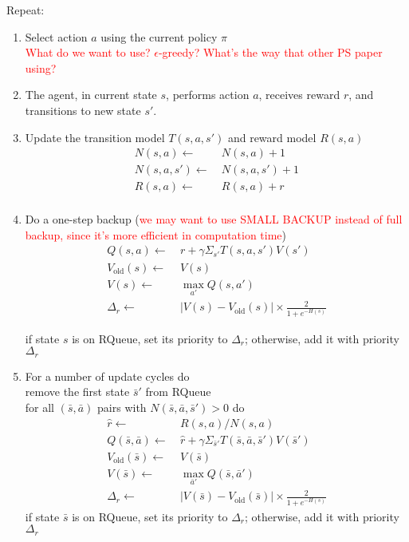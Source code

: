 \documentclass{article}
\begin{document}
Repeat:\\

\begin{enumerate}

\item Select action \(a\) using the current policy $\pi$\\
\textcolor{red}{What do we want to use? $\epsilon$-greedy? What's the way that other PS paper using?}

\item The agent, in current state \(s\), performs action \(a\), receives reward \(r\), and transitions to new state \(s'\).

\item Update the transition model \(T(s,a,s')\) and reward model \(R(s,a)\)
\[
\begin{split}
N(s,a) \leftarrow &\ N(s,a) + 1\\
N(s,a,s') \leftarrow &\ N(s,a,s') + 1\\
R(s,a) \leftarrow &\ R(s,a) + r\\
\end{split}
\]

\item Do a one-step backup (\textcolor{red}{we may want to use SMALL BACKUP instead of full backup, since it's more efficient in computation time})\\
\[
\begin{split}
Q(s,a) \leftarrow &\ r + \gamma \Sigma_{s'}T(s,a,s')V(s')\\
V_{\text{old}}(s) \leftarrow &\ V(s)\\
V(s) \leftarrow &\ \max_{a'}Q(s,a')\\
\Delta_r \leftarrow &\ |V(s)-V_{\text{old}}(s)| \times \frac{2}{1+e^{-H(s)}}
\end{split}
\]

if state $s$ is on RQueue, set its priority to $\Delta_r$; otherwise, add it with priority $\Delta_r$

\item For a number of update cycles do\\
remove the first state $\bar{s}'$ from RQueue\\
for all $(\bar{s},\bar{a})$ pairs with $N(\bar{s},\bar{a},\bar{s}')>0$ do
\[
\begin{split}
\hat{r} \leftarrow &\ R(s,a)/N(s,a)\\
Q(\bar{s},\bar{a}) \leftarrow &\ \hat{r} +  \gamma \Sigma_{\bar{s}'}T(\bar{s},\bar{a},\bar{s}')V(\bar{s}')\\
V_{\text{old}}(\bar{s}) \leftarrow &\ V(\bar{s})\\
V(\bar{s}) \leftarrow &\ \max_{\bar{a}'}Q(\bar{s},\bar{a}')\\
\Delta_r \leftarrow &\ |V(\bar{s})-V_{\text{old}}(\bar{s})| \times \frac{2}{1+e^{-H(s)}}
\end{split}
\] 
if state $\bar{s}$ is on RQueue, set its priority to $\Delta_r$; otherwise, add it with priority $\Delta_r$


\end{enumerate}
\end{document}

